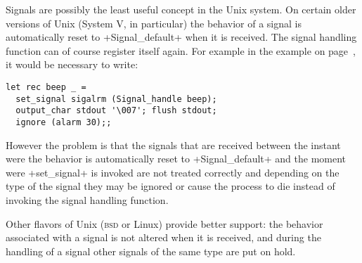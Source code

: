 Signals are possibly the least useful concept in the Unix system.  On
certain older versions of Unix (System V, in particular) the behavior
of a signal is automatically reset to \ml+Signal_default+ when it is
received. The signal handling function can of course register itself
again. For example in the  example on
page~\pageref{ex/beep}, it would be necessary to write:
%
\begin{lstlisting}
let rec beep _ =
  set_signal sigalrm (Signal_handle beep);
  output_char stdout '\007'; flush stdout;
  ignore (alarm 30);;
\end{lstlisting}
%
However the problem is that the signals that are received between the
instant were the behavior is automatically reset to
\ml+Signal_default+ and the moment were \ml+set_signal+ is invoked are
not treated correctly and depending on the type of the signal they may
be ignored or cause the process to die instead of invoking the signal
handling function. 

Other flavors of Unix (\textsc{bsd} or Linux) provide better support:
the behavior associated with a signal is not altered when it is
received, and during the handling of a signal other signals of the
same type are put on hold.


